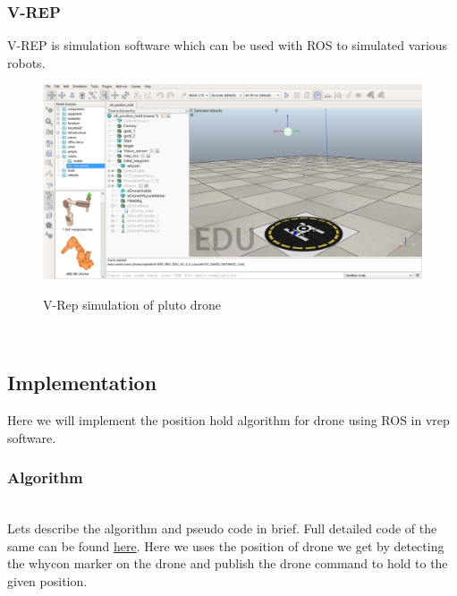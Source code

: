 \subsubsection{V-REP}
V-REP is simulation software which can be used with ROS to simulated various robots.\cite{vrep}
\\
\newline \begin{figure}[H]
    \centering
    \includegraphics[width=\textwidth]{images/vrep.png}
    \\
    \caption{V-Rep simulation of pluto drone}
\end{figure}
\\
\subsection{Implementation}
Here we will implement the position hold algorithm for drone using ROS in vrep software.
\subsubsection{Algorithm}
\\
Lets describe the algorithm and pseudo code in brief. Full detailed code of the same can be found \href{https://github.com/iamrajee/Slam_and_RL_BTP/tree/master/code/pid}{here}. Here we uses the position of drone we get by detecting the whycon marker on the drone and publish the drone command to hold to the given position.

